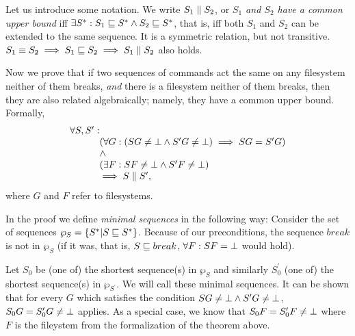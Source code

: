 \begin{table}[H]
Let us introduce some notation. We write 
\(S_1\parallel S_2\), or \emph{\(S_1\) and \(S_2\) have a common upper 
bound} iff
\(\exists S^*: S_1\sqsubseteq S^* \wedge S_2\sqsubseteq S^*\), that is, iff
both \(S_1\) and \(S_2\) can be extended to the same sequence.
It is a symmetric relation, but not transitive.
\(S_1\equiv S_2\implies S_1\sqsubseteq S_2\implies S_1\parallel S_2\) also
holds.

Now we prove that if 
two sequences of commands act the same on any filesystem neither of
them breaks, \emph{and} there is a filesystem neither of them
breaks, then they are also related algebraically; namely, they have a common upper bound.
Formally, 
\[\begin{array}{r@{}l}
\forall S,S':&\\ 
&(\forall G: (SG\ne\ud\wedge S'G\ne\ud)\implies SG=S'G)\\
&\wedge\\
&(\exists F: SF\ne\ud\wedge S'F\ne\ud)\\
&\implies S \eqifnbr S',
\end{array}\]
where \(G\) and \(F\) refer to filesystems. 


In the proof we define \emph{minimal sequences} in the following way:
Consider the set of sequences \(\wp_S = \{ S^* | S \sqsubseteq S^*\}\).
Because of our preconditions, the sequence \(break\) is not in
\(\wp_S\) (if it was, that is, \(S\sqsubseteq break\), \(\forall F:SF=\bot\) would
hold).

Let \(S_0\) be (one of) the shortest sequence(s) in \(\wp_S\) and
similarly
\(S^\prime_0\) (one of) the shortest sequence(s) in \(\wp_{S^\prime}\). 
We will call these minimal sequences. It can be shown that for
every \(G\) which satisfies the condition \(SG\ne\bot\wedge S'G\ne\bot\), 
\(S_0G=S'_0G\ne\bot\) applies.
As a special case, we know that \(S_0F=S'_0F\ne\bot\) where \(F\) is the
fileystem from the formalization of the theorem above.


\end{table}
